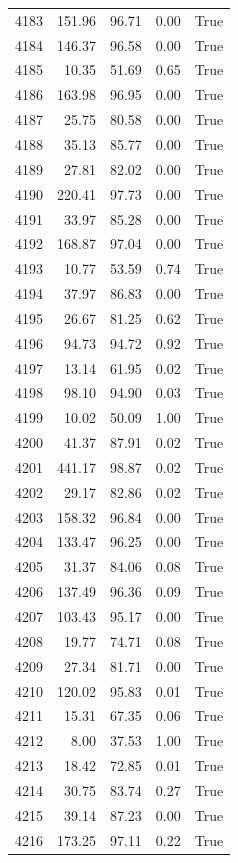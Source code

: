 \begin{longtable}{rrrrr}
4183 & 151.96 & 96.71 & 0.00 & True \\
4184 & 146.37 & 96.58 & 0.00 & True \\
4185 & 10.35 & 51.69 & 0.65 & True \\
4186 & 163.98 & 96.95 & 0.00 & True \\
4187 & 25.75 & 80.58 & 0.00 & True \\
4188 & 35.13 & 85.77 & 0.00 & True \\
4189 & 27.81 & 82.02 & 0.00 & True \\
4190 & 220.41 & 97.73 & 0.00 & True \\
4191 & 33.97 & 85.28 & 0.00 & True \\
4192 & 168.87 & 97.04 & 0.00 & True \\
4193 & 10.77 & 53.59 & 0.74 & True \\
4194 & 37.97 & 86.83 & 0.00 & True \\
4195 & 26.67 & 81.25 & 0.62 & True \\
4196 & 94.73 & 94.72 & 0.92 & True \\
4197 & 13.14 & 61.95 & 0.02 & True \\
4198 & 98.10 & 94.90 & 0.03 & True \\
4199 & 10.02 & 50.09 & 1.00 & True \\
4200 & 41.37 & 87.91 & 0.02 & True \\
4201 & 441.17 & 98.87 & 0.02 & True \\
4202 & 29.17 & 82.86 & 0.02 & True \\
4203 & 158.32 & 96.84 & 0.00 & True \\
4204 & 133.47 & 96.25 & 0.00 & True \\
4205 & 31.37 & 84.06 & 0.08 & True \\
4206 & 137.49 & 96.36 & 0.09 & True \\
4207 & 103.43 & 95.17 & 0.00 & True \\
4208 & 19.77 & 74.71 & 0.08 & True \\
4209 & 27.34 & 81.71 & 0.00 & True \\
4210 & 120.02 & 95.83 & 0.01 & True \\
4211 & 15.31 & 67.35 & 0.06 & True \\
4212 & 8.00 & 37.53 & 1.00 & True \\
4213 & 18.42 & 72.85 & 0.01 & True \\
4214 & 30.75 & 83.74 & 0.27 & True \\
4215 & 39.14 & 87.23 & 0.00 & True \\
4216 & 173.25 & 97.11 & 0.22 & True \\

\end{longtable}
